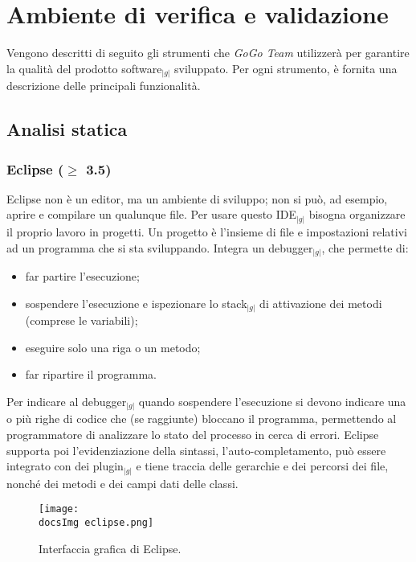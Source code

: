 \section{Ambiente di verifica e validazione}{
	Vengono descritti di seguito gli strumenti che \textit{GoGo Team} utilizzerà per
	garantire la qualità del prodotto software$_{|g|}$ sviluppato. Per ogni strumento, è
	fornita una descrizione delle principali funzionalità.

	\subsection{Analisi statica}{
		\subsubsection{Eclipse ($\geqslant$ 3.5)}{
			Eclipse non è un editor, ma un ambiente di sviluppo; non si può, ad esempio, aprire 
			e compilare un qualunque file. Per usare questo IDE$_{|g|}$ bisogna organizzare il 
			proprio lavoro in progetti. Un progetto è l'insieme di file e impostazioni relativi 
			ad un programma che si sta sviluppando. Integra un debugger$_{|g|}$, che permette di:
				\begin{itemize}
					\item far partire l'esecuzione;
					\item sospendere l'esecuzione e ispezionare lo stack$_{|g|}$ di attivazione 
						dei metodi (comprese le variabili);
					\item eseguire solo una riga o un metodo;
					\item far ripartire il programma.
				\end{itemize}
			Per indicare al debugger$_{|g|}$ quando sospendere l'esecuzione si devono 
			indicare una o più righe di codice che (se raggiunte) bloccano il programma, 
			permettendo al programmatore di analizzare lo stato del processo in cerca di 
			errori. Eclipse supporta poi l'evidenziazione della sintassi, l'auto-completamento,
			può essere integrato con dei plugin$_{|g|}$ e tiene traccia delle gerarchie e dei
			percorsi dei file, nonché dei metodi e dei campi dati delle classi.
			\begin{center}
				\begin{figure}[h!]
					\centering
					\texttt{[image: \\docsImg eclipse.png]}
					\caption{Interfaccia grafica di Eclipse.}	
				\end{figure}
			\end{center}
		
}}}
